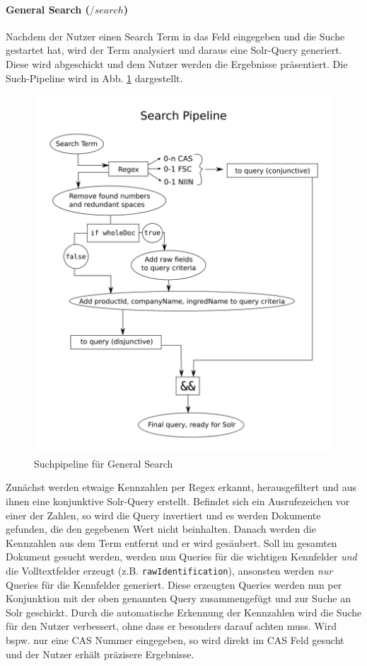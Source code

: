 \documentclass[oneside, a4paper, 12pt, titlepage]{article}
\begin{document}
\paragraph{General Search (\(/search\))}
Nachdem der Nutzer einen Search Term in das Feld eingegeben und die Suche gestartet hat, wird der Term analysiert und daraus eine Solr-Query generiert. Diese wird abgeschickt und dem Nutzer werden die Ergebnisse präsentiert. Die Such-Pipeline wird in Abb. \ref{dia3} dargestellt.
\begin{figure}[!ht]
\caption{Suchpipeline für General Search} \label{dia3}
\includegraphics[scale=0.7]{dia3_svg.png}
\end{figure}
Zunächst werden etwaige Kennzahlen per Regex erkannt, herausgefiltert und aus ihnen eine konjunktive Solr-Query erstellt. Befindet sich ein Ausrufezeichen vor einer der Zahlen, so wird die Query invertiert und es werden Dokumente gefunden, die den gegebenen Wert nicht beinhalten. Danach werden die Kennzahlen aus dem Term entfernt und er wird gesäubert.
Soll im gesamten Dokument gesucht werden, werden nun Queries für die wichtigen Kennfelder \textit{und} die Volltextfelder erzeugt (z.B. \texttt{rawIdentification}), ansonsten werden \textit{nur} Queries für die Kennfelder generiert.
Diese erzeugten Queries werden nun per Konjunktion mit der oben genannten Query zusammengefügt und zur Suche an Solr geschickt.
Durch die automatische Erkennung der Kennzahlen wird die Suche für den Nutzer verbessert, ohne dass er besonders darauf achten muss. Wird bspw. nur eine CAS Nummer eingegeben, so wird direkt im CAS Feld gesucht und der Nutzer erhält präzisere Ergebnisse.
\end{document}
